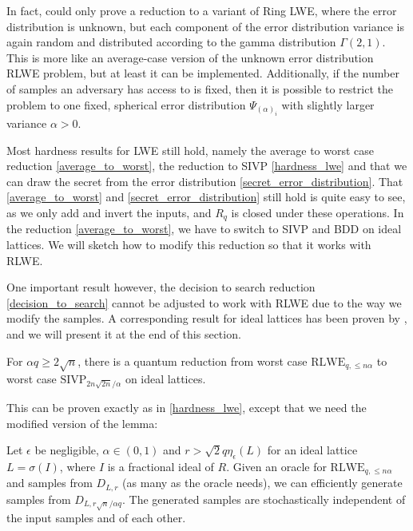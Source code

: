 \documentclass{report}
\begin{document}
In fact, \cite{LyuPeiReg} could only prove a reduction to a variant of Ring LWE, where the error distribution is unknown, but each component of the error distribution variance is again random and distributed according to the gamma distribution $\Gamma(2, 1)$. This is more like an average-case version of the unknown error distribution RLWE problem, but at least it can be implemented. Additionally, if the number of samples an adversary has access to is fixed, then it is possible to restrict the problem to one fixed, spherical error distribution $\Psi_{(\alpha)_i}$ with slightly larger variance $\alpha > 0$.

\remark
Most hardness results for LWE still hold, namely the average to worst case reduction \ref{average_to_worst}, the reduction to SIVP \ref{hardness_lwe} and that we can draw the secret from the error distribution \ref{secret_error_distribution}. That \ref{average_to_worst} and \ref{secret_error_distribution} still hold is quite easy to see, as we only add and invert the inputs, and $R_q$ is closed under these operations. In the reduction \ref{average_to_worst}, we have to switch to SIVP and BDD on ideal lattices. We will sketch how to modify this reduction so that it works with RLWE.

One important result however, the decision to search reduction \ref{decision_to_search} cannot be adjusted to work with RLWE due to the way we modify the samples. A corresponding result for ideal lattices has been proven by \cite{LyuPeiReg}, and we will present it at the end of this section.

\label{hardness_rlwe}
For $\alpha q \geq 2\sqrt{n}$, there is a quantum reduction from worst case $\mathrm{RLWE}_{q, \leq n \alpha}$ to worst case $\mathrm{SIVP}_{2n\sqrt{2n}/\alpha}$ on ideal lattices. 

This can be proven exactly as in \ref{hardness_lwe}, except that we need the modified version of the lemma:

Let $\epsilon$ be negligible, $\alpha \in (0, 1)$ and $r > \sqrt{2}q\eta_\epsilon(L)$ for an ideal lattice $L = \sigma(I)$, where $I$ is a fractional ideal of $R$. Given an oracle for $\mathrm{RLWE}_{q, \leq n \alpha}$ and samples from $D_{L, r}$ (as many as the oracle needs), we can efficiently generate samples from $D_{L, r\sqrt{n}/\alpha q}$. The generated samples are stochastically independent of the input samples and of each other.
\end{document}
